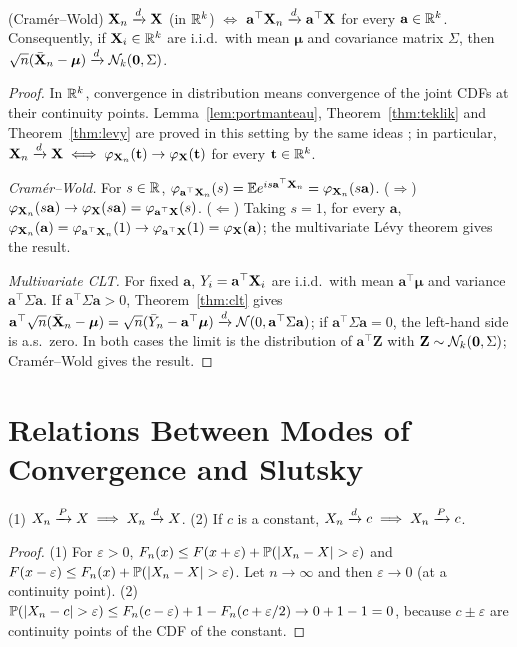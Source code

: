 \documentclass[main.tex]{subfiles}
\begin{document}
\begin{theorem}\label{thm:cok-degiskenli-clt}
(Cramér--Wold) $\mathbf{X}_n\xrightarrow{d}\mathbf{X}$ (in $\mathbb{R}^k$) $\iff$ $\mathbf a^\top\mathbf{X}_n\xrightarrow{d}\mathbf a^\top\mathbf{X}$ for every $\mathbf a\in\mathbb{R}^k$.
Consequently, if $\mathbf{X}_i\in\mathbb{R}^k$ are i.i.d.\ with mean $\bm\mu$ and covariance matrix $\Sigma$, then $\sqrt n(\bar{\mathbf{X}}_n-\bm\mu)\xrightarrow{d}\mathcal{N}_k(\mathbf 0,\Sigma)$.
\end{theorem}
\begin{proof}
In $\mathbb{R}^k$, convergence in distribution means convergence of the joint CDFs at their continuity points. Lemma~\ref{lem:portmanteau}, Theorem~\ref{thm:teklik} and Theorem~\ref{thm:levy} are proved in this setting by the same ideas \cite[Section~29]{billingsley}; in particular, $\mathbf{X}_n\xrightarrow{d}\mathbf{X}\iff\varphi_{\mathbf{X}_n}(\mathbf t)\to\varphi_{\mathbf{X}}(\mathbf t)$ for every $\mathbf t\in\mathbb{R}^k$.

\emph{Cramér--Wold.} For $s\in\mathbb{R}$, $\varphi_{\mathbf a^\top\mathbf{X}_n}(s)=\mathbb{E} e^{is\mathbf a^\top\mathbf{X}_n}=\varphi_{\mathbf{X}_n}(s\mathbf a)$. ($\Rightarrow$) $\varphi_{\mathbf{X}_n}(s\mathbf a)\to\varphi_{\mathbf{X}}(s\mathbf a)=\varphi_{\mathbf a^\top\mathbf{X}}(s)$. ($\Leftarrow$) Taking $s=1$, for every $\mathbf a$, $\varphi_{\mathbf{X}_n}(\mathbf a)=\varphi_{\mathbf a^\top\mathbf{X}_n}(1)\to\varphi_{\mathbf a^\top\mathbf{X}}(1)=\varphi_{\mathbf{X}}(\mathbf a)$; the multivariate Lévy theorem gives the result.

\emph{Multivariate CLT.} For fixed $\mathbf a$, $Y_i=\mathbf a^\top\mathbf{X}_i$ are i.i.d.\ with mean $\mathbf a^\top\bm\mu$ and variance $\mathbf a^\top\Sigma\mathbf a$. If $\mathbf a^\top\Sigma\mathbf a>0$, Theorem~\ref{thm:clt} gives $\mathbf a^\top\sqrt n(\bar{\mathbf{X}}_n-\bm\mu)=\sqrt n(\bar Y_n-\mathbf a^\top\bm\mu)\xrightarrow{d}\mathcal{N}(0,\mathbf a^\top\Sigma\mathbf a)$; if $\mathbf a^\top\Sigma\mathbf a=0$, the left-hand side is a.s.\ zero. In both cases the limit is the distribution of $\mathbf a^\top\mathbf Z$ with $\mathbf Z\sim\mathcal{N}_k(\mathbf 0,\Sigma)$; Cramér--Wold gives the result.
\end{proof}

\section{Relations Between Modes of Convergence and Slutsky}

\begin{proposition}\label{prop:p-d}
(1) $X_n\xrightarrow{P} X\implies X_n\xrightarrow{d} X$. (2) If $c$ is a constant, $X_n\xrightarrow{d} c\implies X_n\xrightarrow{P} c$.
\end{proposition}
\begin{proof}
(1) For $\varepsilon>0$, $F_n(x)\le F(x+\varepsilon)+\P(|X_n-X|>\varepsilon)$ and $F(x-\varepsilon)\le F_n(x)+\P(|X_n-X|>\varepsilon)$. Let $n\to\infty$ and then $\varepsilon\to0$ (at a continuity point).
(2) $\P(|X_n-c|>\varepsilon)\le F_n(c-\varepsilon)+1-F_n(c+\varepsilon/2)\to0+1-1=0$, because $c\pm\varepsilon$ are continuity points of the CDF of the constant.
\end{proof}
\end{document}
